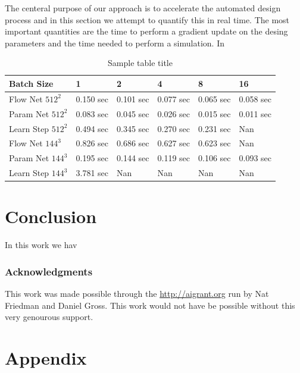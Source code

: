 \documentclass{article} %
\begin{document}
The centeral purpose of our approach is to accelerate the automated design process and in this section we attempt to quantify this in real time. The most important quantities are the time to perform a gradient update on the desing parameters and the time needed to perform a simulation. In 

\begin{table}[t]
\caption{Sample table title}
\label{sample-table}
\begin{center}
\begin{tabular}{l|lllll}
Batch Size & 1 & 2 & 4 & 8 & 16 \\ \hline 
Flow Net $512^2$ & 0.150 sec & 0.101 sec & 0.077 sec & 0.065 sec & 0.058 sec \\ 
Param Net $512^2$ & 0.083 sec & 0.045 sec & 0.026 sec & 0.015 sec & 0.011 sec \\ 
Learn Step $512^2$ & 0.494 sec & 0.345 sec & 0.270 sec & 0.231 sec & Nan \\ 
Flow Net $144^3$ & 0.826 sec & 0.686 sec & 0.627 sec & 0.623 sec & Nan \\ 
Param Net $144^3$ & 0.195 sec & 0.144 sec & 0.119 sec & 0.106 sec & 0.093 sec \\ 
Learn Step $144^3$ & 3.781 sec & Nan & Nan & Nan & Nan \\ 
\end{tabular}
\end{center}
\end{table}




\section{Conclusion}

In this work we hav

\subsubsection*{Acknowledgments}

This work was made possible through the \url{http://aigrant.org} run by Nat Friedman and Daniel Gross. This work would not have be possible without this very genourous support.




\section{Appendix}
\end{document}
